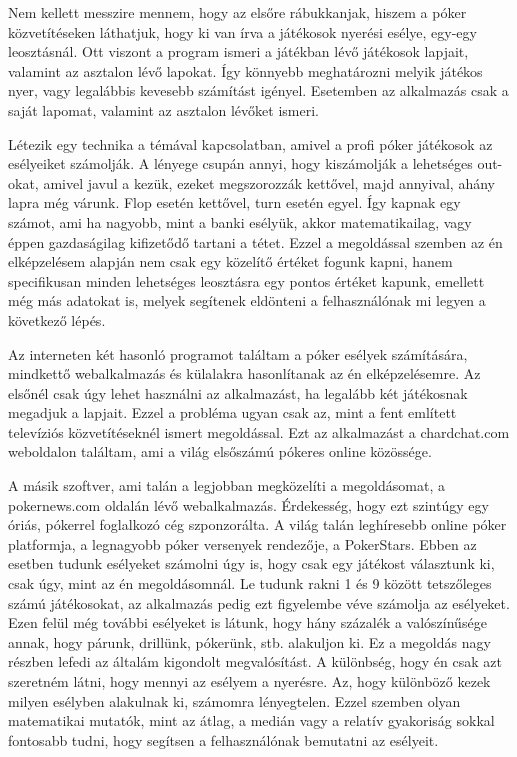 Nem kellett messzire mennem, hogy az elsőre rábukkanjak, hiszem a póker közvetítéseken láthatjuk, hogy ki van írva a játékosok nyerési esélye, egy-egy leosztásnál. Ott viszont a program ismeri a játékban lévő játékosok lapjait, valamint az asztalon lévő lapokat. Így könnyebb meghatározni melyik játékos nyer, vagy legalábbis kevesebb számítást igényel. Esetemben az alkalmazás csak a saját lapomat, valamint az asztalon lévőket ismeri.

Létezik egy technika a témával kapcsolatban, amivel a profi póker játékosok az esélyeiket számolják. A lényege csupán annyi, hogy kiszámolják a lehetséges out-okat, amivel javul a kezük, ezeket megszorozzák kettővel, majd annyival, ahány lapra még várunk. Flop esetén kettővel, turn esetén egyel. Így kapnak egy számot, ami ha nagyobb, mint a banki esélyük, akkor matematikailag, vagy éppen gazdaságilag kifizetődő tartani a tétet. Ezzel a megoldással szemben az én elképzelésem alapján nem csak egy közelítő értéket fogunk kapni, hanem specifikusan minden lehetséges leosztásra egy pontos értéket kapunk, emellett még más adatokat is, melyek segítenek eldönteni a felhasználónak mi legyen a következő lépés.

Az interneten két hasonló programot találtam a póker esélyek számítására, mindkettő webalkalmazás és külalakra hasonlítanak az én elképzelésemre. Az elsőnél csak úgy lehet használni az alkalmazást, ha legalább két játékosnak megadjuk a lapjait. Ezzel a probléma ugyan csak az, mint a fent említett televíziós közvetítéseknél ismert megoldással. Ezt az alkalmazást a chardchat.com weboldalon találtam, ami a világ elsőszámú pókeres online közössége.

A másik szoftver, ami talán a legjobban megközelíti a megoldásomat, a pokernews.com oldalán lévő webalkalmazás. Érdekesség, hogy ezt szintúgy egy óriás, pókerrel foglalkozó cég szponzorálta. A világ talán leghíresebb online póker platformja, a legnagyobb póker versenyek rendezője, a PokerStars. Ebben az esetben tudunk esélyeket számolni úgy is, hogy csak egy játékost választunk ki, csak úgy, mint az én megoldásomnál. Le tudunk rakni 1 és 9 között tetszőleges számú játékosokat, az alkalmazás pedig ezt figyelembe véve számolja az esélyeket. Ezen felül még további esélyeket is látunk, hogy hány százalék a valószínűsége annak, hogy párunk, drillünk, pókerünk, stb. alakuljon ki. Ez a megoldás nagy részben lefedi az általám kigondolt megvalósítást. A különbség, hogy én csak azt szeretném látni, hogy mennyi az esélyem a nyerésre. Az, hogy különböző kezek milyen esélyben alakulnak ki, számomra lényegtelen. Ezzel szemben olyan matematikai mutatók, mint az átlag, a medián vagy a relatív gyakoriság sokkal fontosabb tudni, hogy segítsen a felhasználónak bemutatni az esélyeit.

